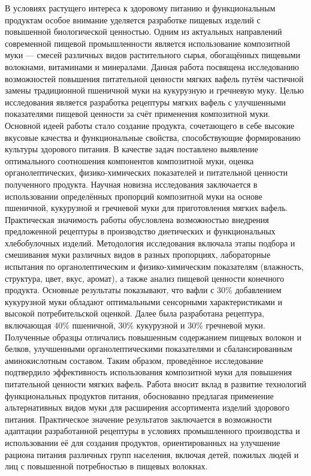 В условиях растущего интереса к здоровому питанию и функциональным
продуктам особое внимание уделяется разработке пищевых изделий с
повышенной биологической ценностью. Одним из актуальных направлений
современной пищевой промышленности является использование композитной
муки --- смесей различных видов растительного сырья, обогащённых
пищевыми волокнами, витаминами и минералами. Данная работа посвящена
исследованию возможностей повышения питательной ценности мягких вафель
путём частичной замены традиционной пшеничной муки на кукурузную и
гречневую муку. Целью исследования является разработка рецептуры мягких
вафель с улучшенными показателями пищевой ценности за счёт применения
композитной муки. Основной идеей работы стало создание продукта,
сочетающего в себе высокие вкусовые качества и функциональные свойства,
способствующие формированию культуры здорового питания. В качестве задач
поставлено выявление оптимального соотношения компонентов композитной
муки, оценка органолептических, физико-химических показателей и
питательной ценности полученного продукта. Научная новизна исследования
заключается в использовании определённых пропорций композитной муки на
основе пшеничной, кукурузной и гречневой муки для приготовления мягких
вафель. Практическая значимость работы обусловлена возможностью
внедрения предложенной рецептуры в производство диетических и
функциональных хлебобулочных изделий. Методология исследования включала
этапы подбора и смешивания муки различных видов в разных пропорциях,
лабораторные испытания по органолептическим и физико-химическим
показателям (влажность, структура, цвет, вкус, аромат), а также анализ
пищевой ценности конечного продукта. Основные результаты показывают, что
вафли с 30\% добавлением кукурузной муки обладают оптимальными
сенсорными характеристиками и высокой потребительской оценкой. Далее
была разработана рецептура, включающая 40\% пшеничной, 30\% кукурузной и
30\% гречневой муки. Полученные образцы отличались повышенным
содержанием пищевых волокон и белков, улучшенными органолептическими
показателями и сбалансированным аминокислотным составом. Таким образом,
проведённое исследование подтвердило эффективность использования
композитной муки для повышения питательной ценности мягких вафель.
Работа вносит вклад в развитие технологий функциональных продуктов
питания, обоснованно предлагая применение альтернативных видов муки для
расширения ассортимента изделий здорового питания. Практическое значение
результатов заключается в возможности адаптации разработанной рецептуры
в условиях промышленного производства и использовании её для создания
продуктов, ориентированных на улучшение рациона питания различных групп
населения, включая детей, пожилых людей и лиц с повышенной потребностью
в пищевых волокнах.

